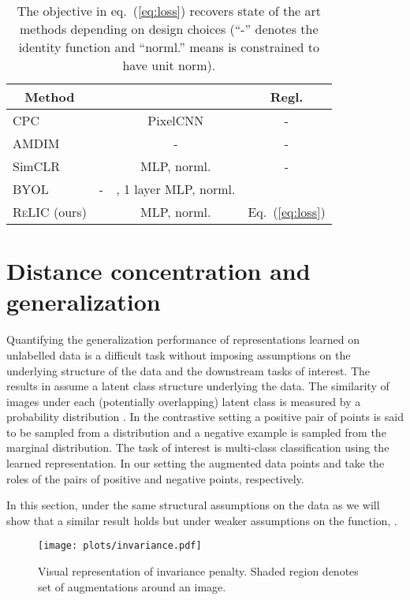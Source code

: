 \documentclass{article}
\def\eqref#1{eq.~(\ref{#1})}
\def\Eqref#1{Eq.~(\ref{#1})}
\newcommand{\relic}{\textsc{ReLIC}}
\begin{document}
\begin{table}[h]
\begin{center}
\caption{The objective in \eqref{eq:loss} recovers state of the art methods depending on design choices  (``-'' denotes the identity function and ``norml.'' means  is constrained to have unit norm). \label{tab:methods}}
\vspace{0.2cm}
\begin{tabular}{l|c|c|c}
\multicolumn{1}{c|}{Method}       &                                &   & Regl. \\ \hline
CPC   \citep{henaff2019data}   &      & PixelCNN & - \\
AMDIM \citep{bachman2019learning}  &        & - & - \\
SimCLR \citep{chen2020simple} &  & MLP, norml. & -  \\
BYOL \citep{grill2020bootstrap} & - & ,  1 layer MLP, norml. &    \\ 
\relic \; (ours)&  & MLP, norml. & \Eqref{eq:loss}  \\
\end{tabular}
\end{center}
\end{table}
 \section{Distance concentration and generalization} \label{sec:gen-theory_main}


Quantifying the generalization performance of representations learned on unlabelled data is a difficult task without imposing assumptions on the underlying structure of the data and the downstream tasks of interest. The results in \citep{saunshi2019theoretical} assume a latent class structure underlying the data. The similarity of images under each (potentially overlapping) latent class  is measured by a probability distribution . In the contrastive setting a positive pair of points  is said to be sampled from a distribution  and a negative example  is sampled from the marginal distribution. The task of interest is multi-class classification using the learned representation. In our setting the augmented data points  and  take the roles of the pairs of positive and negative points, respectively.

In this section, under the same structural assumptions on the data as \citep{saunshi2019theoretical} we will show that a similar result holds but under weaker assumptions on the function, . 

\begin{wrapfigure}{r}{0.30\textwidth}
\vspace{-0.5cm}
  \begin{center}
    \texttt{[image: plots/invariance.pdf]}
  \end{center}
  \caption{Visual representation of invariance penalty. Shaded region denotes set of augmentations around an image.\label{fig:invariance}}
  \vspace{-0.7cm}
\end{wrapfigure}
\end{document}
